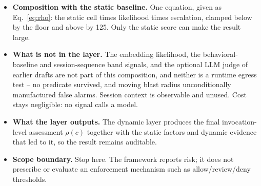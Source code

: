 \begin{itemize}
  \item \textbf{Composition with the static baseline.} One equation, given as
        Eq.~\ref{eq:rho}: the static cell times likelihood times escalation,
        clamped below by the floor and above by 125. Only the static score can
        make the result large.

  \item \textbf{What is not in the layer.} The embedding likelihood, the
        behavioral-baseline and session-sequence band signals, and the optional
        LLM judge of earlier drafts are not part of this composition, and
        neither is a runtime egress test -- no predicate survived, and moving
        blast radius unconditionally manufactured false alarms. Session context
        is observable and unused. Cost stays negligible: no signal calls a
        model.

  \item \textbf{What the layer outputs.} The dynamic layer produces the final
        invocation-level assessment $\rho(c)$ together with the static factors
        and dynamic evidence that led to it, so the result remains auditable.

  \item \textbf{Scope boundary.} Stop here. The framework reports risk; it does
        not prescribe or evaluate an enforcement mechanism such as
        allow/review/deny thresholds.
\end{itemize}

%
%
%
%
%
